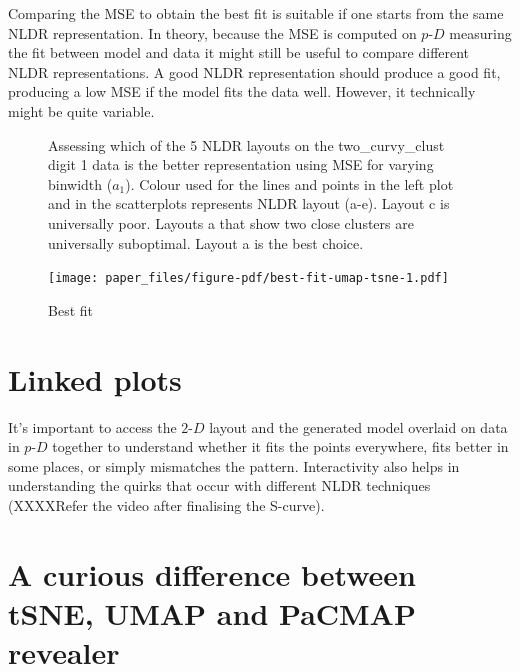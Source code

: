 \documentclass[
  12pt]{article}
\newcommand\pD{$p\text{-}D$}
\newcommand\gD{$2\text{-}D$}
\begin{document}
Comparing the MSE to obtain the best fit is suitable if one starts from
the same NLDR representation. In theory, because the MSE is computed on
\pD{} measuring the fit between model and data it might still be useful
to compare different NLDR representations. A good NLDR representation
should produce a good fit, producing a low MSE if the model fits the
data well. However, it technically might be quite variable.

\begin{figure}[H]


\caption{\label{fig-two_curvy_clust-mse}Assessing which of the 5 NLDR
layouts on the two\_curvy\_clust digit 1 data is the better
representation using MSE for varying binwidth (\(a_1\)). Colour used for
the lines and points in the left plot and in the scatterplots represents
NLDR layout (a-e). Layout c is universally poor. Layouts a that show two
close clusters are universally suboptimal. Layout a is the best choice.}

\end{figure}%

\begin{figure}[H]

{\centering \texttt{[image: paper\_files/figure-pdf/best-fit-umap-tsne-1.pdf]}

}

\caption{Best fit}

\end{figure}%

\section{Linked plots}\label{linked-plots}

It's important to access the \gD{} layout and the generated model
overlaid on data in \pD{} together to understand whether it fits the
points everywhere, fits better in some places, or simply mismatches the
pattern. Interactivity also helps in understanding the quirks that occur
with different NLDR techniques (XXXXRefer the video after finalising the
S-curve).

\section{A curious difference between tSNE, UMAP and PaCMAP
revealer}\label{a-curious-difference-between-tsne-umap-and-pacmap-revealer}
\end{document}
